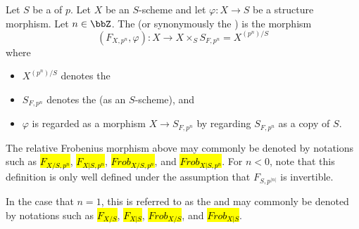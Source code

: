 \begin{definition} \label{definition:relative_frobenius_morphism_of_a_scheme_over_a_scheme_of_prime_characteristic}
    Let $S$ be a  of  $p$. Let $X$ be an $S$-scheme and let $\varphi: X \to S$ be a structure morphism. Let $n \in \bbZ$.
    The  (or synonymously the ) is the morphism
    $$(F_{X,p^n}, \varphi): X \to  X \times_S S_{F,p^n} = X^{(p^n)/S}$$
    where
    \begin{itemize}
        \item $X^{(p^n)/S}$ denotes the 
        \item $S_{F,p^n}$ denotes the  (as an $S$-scheme), and 
        \item $\varphi$ is regarded as a morphism $X \to S_{F,p^n}$ by regarding $S_{F,p^n}$ as a copy of $S$. 
    \end{itemize}
    The relative Frobenius morphism above may commonly be denoted by notations such as \hl{$F_{X/S, p^n}$}, \hl{$F_{X|S, p^n}$}, \hl{$Frob_{X/S, p^n}$}, and \hl{$Frob_{X|S, p^n}$}. For $n < 0$, note that this definition is only well defined under the assumption that $F_{S,p^{|n|}}$ is invertible. 


    In the case that $n = 1$, this is referred to as the  and may commonly be denoted by notations such as \hl{$F_{X/S}$}, \hl{$F_{X|S}$}, \hl{$Frob_{X/S}$}, and \hl{$Frob_{X|S}$}.
\end{definition}